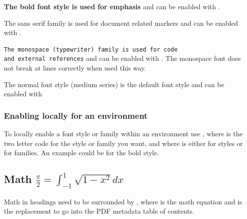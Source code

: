 \textbf{The bold font style is used for emphasis}
and can be enabled with .

\textsf{The sans serif family is used for document related markers}
and can be enabled with .

\texttt{The monospace (typewriter) family is used for code}\\
\texttt{and external references}
and can be enabled with .
The monospace font does not break at lines correctly when used this way.

\textmd{The normal font style (medium series) is the default font style}
and can be enabled with 

\subsubsection{Enabling locally for an environment}
To locally enable a font style or family within an environment use ,
where  is the two letter code for the style or family you want,
and where  is either
 for styles
or  for  families.
An example could be  for the bold style.


\subsection{Math
    \texorpdfstring
        {$\frac{\pi}{2} = \int_{-1}^{1} \sqrt{1-x^2}dx$}
        {equation pi calculated by integral}
}
Math in headings need to be surrounded by ,
where  is the math equation
and  is the replacement to go into the PDF metadata table of contents.

